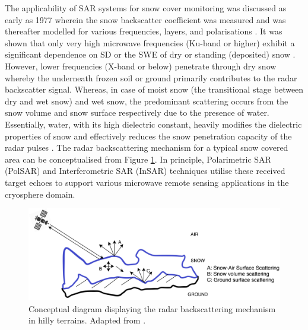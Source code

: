 \documentclass[12pt]{elsarticle}
\numberwithin{equation}{section}
\numberwithin{figure}{section}
\numberwithin{table}{section}
\begin{document}
The applicability of SAR systems for snow cover monitoring was discussed as early as 1977 \citep{Ulaby1977} wherein the snow backscatter coefficient was measured and was thereafter modelled for various frequencies, layers, and polarisations \citep{Zuniga1979}. It was shown that only very high microwave frequencies (Ku-band or higher) exhibit a significant dependence on SD or the SWE of dry or standing (deposited) snow \citep{Yueh2009}. However, lower frequencies (X-band or below) penetrate through dry snow whereby the underneath frozen soil or ground primarily contributes to the radar backscatter signal. Whereas, in case of moist snow (the transitional stage between dry and wet snow) and wet snow, the predominant scattering occurs from the snow volume and snow surface respectively due to the presence of water. Essentially, water, with its high dielectric constant, heavily modifies the dielectric properties of snow and effectively reduces the snow penetration capacity of the radar pulses \citep{Abe1990}. The radar backscattering mechanism for a typical snow covered area can be conceptualised from Figure \ref{fig:concept}. In principle, Polarimetric SAR (PolSAR) and Interferometric SAR (InSAR) techniques utilise these received target echoes to support various microwave remote sensing applications in the cryosphere domain.

\begin{figure}[htb]
    \centering
    \includegraphics[width=\textwidth]{Figures/Conceptual.png}
    \caption{Conceptual diagram displaying the radar backscattering mechanism in hilly terrains. Adapted from \cite{Thakur2012}.}
    \label{fig:concept}
\end{figure}
\end{document}
